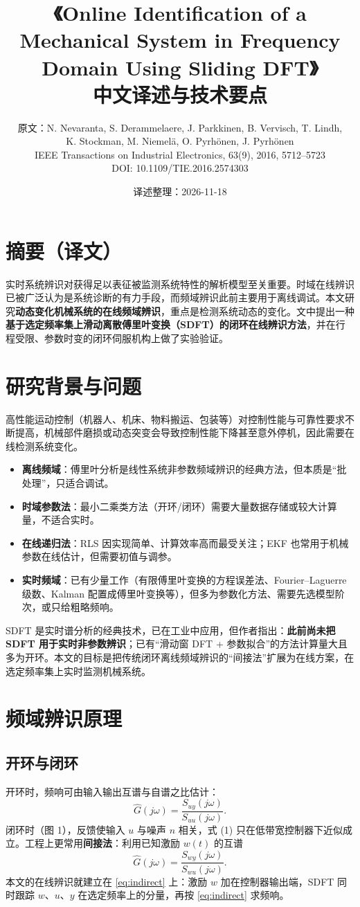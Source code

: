 \documentclass[UTF8,a4paper,11pt]{ctexart}
\title{\textbf{《Online Identification of a Mechanical System in Frequency Domain Using Sliding DFT》\\中文译述与技术要点}}
\author{原文：N. Nevaranta, S. Derammelaere, J. Parkkinen, B. Vervisch, T. Lindh,\\ K. Stockman, M. Niemel\"a, O. Pyrh\"onen, J. Pyrh\"onen\\ \small IEEE Transactions on Industrial Electronics, 63(9), 2016, 5712--5723\\ DOI: 10.1109/TIE.2016.2574303}
\date{译述整理：2026-11-18}
\begin{document}
\maketitle

\section*{摘要（译文）}
实时系统辨识对获得足以表征被监测系统特性的解析模型至关重要。时域在线辨识已被广泛认为是系统诊断的有力手段，而频域辨识此前主要用于离线调试。本文研究\textbf{动态变化机械系统的在线频域辨识}，重点是检测系统动态的变化。文中提出一种\textbf{基于选定频率集上滑动离散傅里叶变换（SDFT）的闭环在线辨识方法}，并在行程受限、参数时变的闭环伺服机构上做了实验验证。

\section{研究背景与问题}
高性能运动控制（机器人、机床、物料搬运、包装等）对控制性能与可靠性要求不断提高，机械部件磨损或动态突变会导致控制性能下降甚至意外停机，因此需要在线检测系统变化。
\begin{itemize}
  \item \textbf{离线频域}：傅里叶分析是线性系统非参数频域辨识的经典方法，但本质是“批处理”，只适合调试。
  \item \textbf{时域参数法}：最小二乘类方法（开环/闭环）需要大量数据存储或较大计算量，不适合实时。
  \item \textbf{在线递归法}：RLS 因实现简单、计算效率高而最受关注；EKF 也常用于机械参数在线估计，但需要初值与调参。
  \item \textbf{实时频域}：已有少量工作（有限傅里叶变换的方程误差法、Fourier--Laguerre 级数、Kalman 配置成傅里叶变换等），但多为参数化方法、需要先选模型阶次，或只给粗略频响。
\end{itemize}
SDFT 是实时谱分析的经典技术，已在工业中应用，但作者指出：\textbf{此前尚未把 SDFT 用于实时非参数辨识}；已有“滑动窗 DFT + 参数拟合”的方法计算量大且多为开环。本文的目标是把传统闭环离线频域辨识的“间接法”扩展为在线方案，在选定频率集上实时监测机械系统。

\section{频域辨识原理}
\subsection{开环与闭环}
开环时，频响可由输入输出互谱与自谱之比估计：
\begin{equation}
\hat G(j\omega)=\frac{S_{uy}(j\omega)}{S_{uu}(j\omega)}.
\end{equation}
闭环时（图 1），反馈使输入 $u$ 与噪声 $n$ 相关，式 (1) 只在低带宽控制器下近似成立。工程上更常用\textbf{间接法}：利用已知激励 $w(t)$ 的互谱
\begin{equation}
\hat G(j\omega)=\frac{S_{wy}(j\omega)}{S_{wu}(j\omega)}.
\label{eq:indirect}
\end{equation}
本文的在线辨识就建立在 \eqref{eq:indirect} 上：激励 $w$ 加在控制器输出端，SDFT 同时跟踪 $w$、$u$、$y$ 在选定频率上的分量，再按 \eqref{eq:indirect} 求频响。
\end{document}
